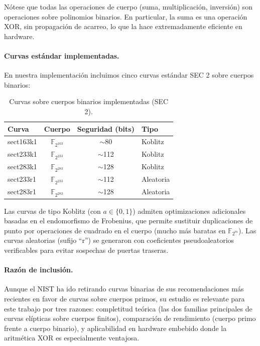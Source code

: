 Nótese que todas las operaciones de cuerpo (suma, multiplicación, inversión) son operaciones sobre polinomios binarios. En particular, la suma es una operación XOR, sin propagación de acarreo, lo que la hace extremadamente eficiente en hardware.

\paragraph{Curvas estándar implementadas.}
En nuestra implementación incluimos cinco curvas estándar SEC 2 \cite{sec2-v2} sobre cuerpos binarios:

\begin{table}[htbp]
\centering
\begin{tabular}{lccl}
\hline
\textbf{Curva} & \textbf{Cuerpo} & \textbf{Seguridad (bits)} & \textbf{Tipo} \\
\hline
sect163k1 & $\mathbb{F}_{2^{163}}$ & $\sim$80  & Koblitz \\
sect233k1 & $\mathbb{F}_{2^{233}}$ & $\sim$112 & Koblitz \\
sect283k1 & $\mathbb{F}_{2^{283}}$ & $\sim$128 & Koblitz \\
sect233r1 & $\mathbb{F}_{2^{233}}$ & $\sim$112 & Aleatoria \\
sect283r1 & $\mathbb{F}_{2^{283}}$ & $\sim$128 & Aleatoria \\
\hline
\end{tabular}
\caption{Curvas sobre cuerpos binarios implementadas (SEC 2).}
\label{tab:binary-curves}
\end{table}

Las curvas de tipo Koblitz (con $a \in \{0, 1\}$) admiten optimizaciones adicionales basadas en el endomorfismo de Frobenius, que permite sustituir duplicaciones de punto por operaciones de cuadrado en el cuerpo (mucho más baratas en $\mathbb{F}_{2^m}$). Las curvas aleatorias (sufijo ``r'') se generaron con coeficientes pseudoaleatorios verificables para evitar sospechas de puertas traseras.

\paragraph{Razón de inclusión.}
Aunque el NIST ha ido retirando curvas binarias de sus recomendaciones más recientes en favor de curvas sobre cuerpos primos, su estudio es relevante para este trabajo por tres razones: completitud teórica (las dos familias principales de curvas elípticas sobre cuerpos finitos), comparación de rendimiento (cuerpo primo frente a cuerpo binario), y aplicabilidad en hardware embebido donde la aritmética XOR es especialmente ventajosa.


